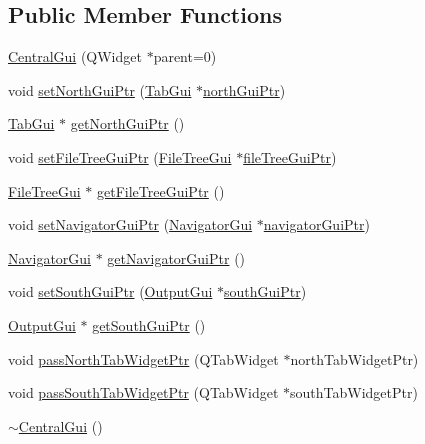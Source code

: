 \subsection*{Public Member Functions}
\begin{DoxyCompactItemize}
\item 
\hyperlink{class_central_gui_aba31873e4b5d4bf9fd1e563601efc4e7}{Central\-Gui} (Q\-Widget $\ast$parent=0)
\item 
void \hyperlink{class_central_gui_a4c4fb762977d1295b564b36537299ed7}{set\-North\-Gui\-Ptr} (\hyperlink{class_tab_gui}{Tab\-Gui} $\ast$\hyperlink{class_central_gui_a9b03db6d32ac3138fde0213d41bea0af}{north\-Gui\-Ptr})
\item 
\hyperlink{class_tab_gui}{Tab\-Gui} $\ast$ \hyperlink{class_central_gui_aeb363fd8e3880fa97b52eaf6d905e1d4}{get\-North\-Gui\-Ptr} ()
\item 
void \hyperlink{class_central_gui_a65abd3c9dc8bb14a60ca89da399c427e}{set\-File\-Tree\-Gui\-Ptr} (\hyperlink{class_file_tree_gui}{File\-Tree\-Gui} $\ast$\hyperlink{class_central_gui_a6abfae93daa17e3af2a814888c9c14cf}{file\-Tree\-Gui\-Ptr})
\item 
\hyperlink{class_file_tree_gui}{File\-Tree\-Gui} $\ast$ \hyperlink{class_central_gui_aba7129fa7a935565409beb63498c2eb3}{get\-File\-Tree\-Gui\-Ptr} ()
\item 
void \hyperlink{class_central_gui_ab8375fbf4f11a785d1bdf35c6678f7fd}{set\-Navigator\-Gui\-Ptr} (\hyperlink{class_navigator_gui}{Navigator\-Gui} $\ast$\hyperlink{class_central_gui_a902df8268cd1e83d1991ea88eafb9220}{navigator\-Gui\-Ptr})
\item 
\hyperlink{class_navigator_gui}{Navigator\-Gui} $\ast$ \hyperlink{class_central_gui_a700dcc17aa9827601879655206117fef}{get\-Navigator\-Gui\-Ptr} ()
\item 
void \hyperlink{class_central_gui_af407a4ca044dccbdb7363ed9d200ab1c}{set\-South\-Gui\-Ptr} (\hyperlink{class_output_gui}{Output\-Gui} $\ast$\hyperlink{class_central_gui_ae7012a7f0abe1fea596ce6af795c1741}{south\-Gui\-Ptr})
\item 
\hyperlink{class_output_gui}{Output\-Gui} $\ast$ \hyperlink{class_central_gui_a210462a5153619fbf617f999c4e54e4c}{get\-South\-Gui\-Ptr} ()
\item 
void \hyperlink{class_central_gui_a072a884564050875f6d8be502976e2a6}{pass\-North\-Tab\-Widget\-Ptr} (Q\-Tab\-Widget $\ast$north\-Tab\-Widget\-Ptr)
\item 
void \hyperlink{class_central_gui_a9f2e7b269810e32cb32ad0fb83b046a6}{pass\-South\-Tab\-Widget\-Ptr} (Q\-Tab\-Widget $\ast$south\-Tab\-Widget\-Ptr)
\item 
\hyperlink{class_central_gui_ad54c2077e29d7a2017399b39e62c1043}{$\sim$\-Central\-Gui} ()
\end{DoxyCompactItemize}
